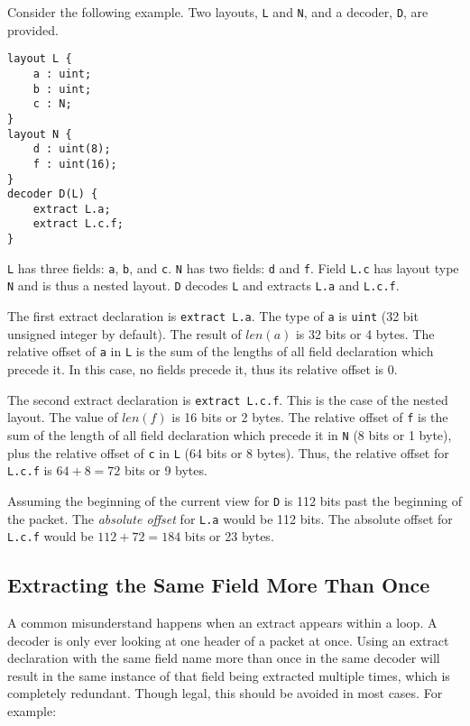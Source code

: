 Consider the following example. Two layouts, \texttt{L} and \texttt{N}, and a decoder, \texttt{D}, are provided.

\begin{minip}
\begin{lstlisting}
layout L {
	a : uint;
	b : uint;
	c : N;
}
layout N {
	d : uint(8);
	f : uint(16);
}
decoder D(L) {
	extract L.a;
	extract L.c.f;
}
\end{lstlisting}
\end{minip}

\texttt{L} has three fields: \texttt{a}, \texttt{b}, and \texttt{c}.  \texttt{N} has two fields: \texttt{d} and \texttt{f}. Field \texttt{L.c} has layout type \texttt{N} and is thus a nested layout. \texttt{D} decodes \texttt{L} and extracts \texttt{L.a} and \texttt{L.c.f}.

The first extract declaration is \texttt{extract L.a}. The type of \texttt{a} is \texttt{uint} (32 bit unsigned integer by default). The result of $len(a)$ is 32 bits or 4 bytes. The relative offset of \texttt{a} in \texttt{L} is the sum of the lengths of all field declaration which precede it. In this case, no fields precede it, thus its relative offset is 0.

The second extract declaration is \texttt{extract L.c.f}. This is the case of the nested layout. The value of $len(f)$ is 16 bits or 2 bytes. The relative offset of \texttt{f} is the sum of the length of all field declaration which precede it in \texttt{N} (8 bits or 1 byte), plus the relative offset of \texttt{c} in \texttt{L} (64 bits or 8 bytes). Thus, the relative offset for \texttt{L.c.f} is $64+8=72$ bits or 9 bytes.

Assuming the beginning of the current view for \texttt{D} is 112 bits past the beginning of the packet. The \textit{absolute offset} for \texttt{L.a} would be 112 bits. The absolute offset for \texttt{L.c.f} would be $112+72=184$ bits or 23 bytes.

\subsection{Extracting the Same Field More Than Once}

A common misunderstand happens when an extract appears within a loop.
A decoder is only ever looking at one header of a packet at once. Using an extract declaration with the same field name more than once in the same decoder will result in the same instance of that field being extracted multiple times, which is completely redundant. Though legal, this should be avoided in most cases. For example: 

